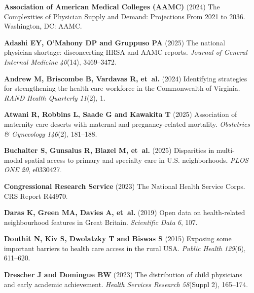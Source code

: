 \documentclass{CUP-JNL-DAP}%
\begin{document}
\begin{Backmatter}

\begin{thebibliography}{}

\textbf{Association of American Medical Colleges (AAMC)} (2024) The Complexities of Physician Supply and Demand: Projections From 2021 to 2036. Washington, DC: AAMC.

\textbf{Adashi EY, O'Mahony DP and Gruppuso PA} (2025) The national physician shortage: disconcerting HRSA and AAMC reports. \textit{Journal of General Internal Medicine} \textit{40}(14), 3469--3472.

\textbf{Andrew M, Briscombe B, Vardavas R, et~al.} (2024) Identifying strategies for strengthening the health care workforce in the Commonwealth of Virginia. \textit{RAND Health Quarterly} \textit{11}(2), 1.

\textbf{Atwani R, Robbins L, Saade G and Kawakita T} (2025) Association of maternity care deserts with maternal and pregnancy-related mortality. \textit{Obstetrics \& Gynecology} \textit{146}(2), 181--188.

\textbf{Buchalter S, Gunsalus R, Blazel M, et~al.} (2025) Disparities in multi-modal spatial access to primary and specialty care in U.S. neighborhoods. \textit{PLOS ONE} \textit{20}, e0330427.

\textbf{Congressional Research Service} (2023) The National Health Service Corps. CRS Report R44970.

\textbf{Daras K, Green MA, Davies A, et~al.} (2019) Open data on health-related neighbourhood features in Great Britain. \textit{Scientific Data} \textit{6}, 107.

\textbf{Douthit N, Kiv S, Dwolatzky T and Biswas S} (2015) Exposing some important barriers to health care access in the rural USA. \textit{Public Health} \textit{129}(6), 611--620.

\textbf{Drescher J and Domingue BW} (2023) The distribution of child physicians and early academic achievement. \textit{Health Services Research} \textit{58}(Suppl 2), 165--174.


\end{thebibliography}
\end{Backmatter}
\end{document}
